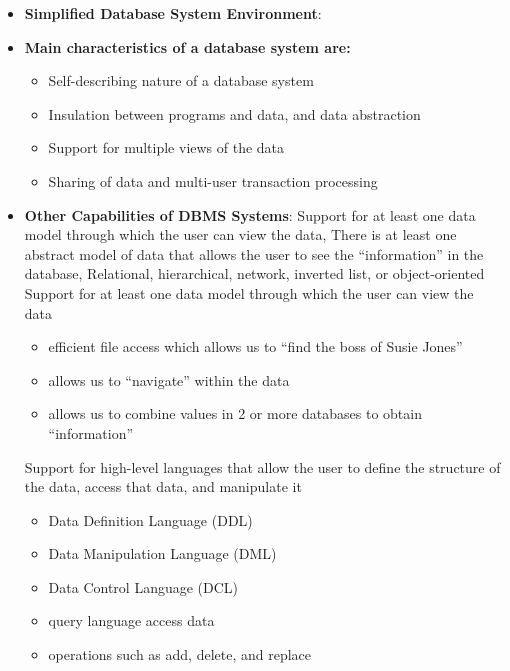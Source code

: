 \documentclass{report}
\begin{document}
\begin{itemize}
\begin{itemize}
            \end{itemize}
        \item \textbf{Simplified Database System Environment}:
            \bigbreak \noindent 
        \item \textbf{Main characteristics of a database system are:}
            \begin{itemize}
                \item Self-describing nature of a database system
                \item Insulation between programs and data, and data abstraction
                \item Support for multiple views of the data
                \item Sharing of data and multi-user transaction processing
            \end{itemize}
        \item \textbf{Other Capabilities of DBMS Systems}: Support for at least one data model through which the user can view the data, There is at least one abstract model of data that allows the user to see the “information” in the database, Relational, hierarchical, network, inverted list, or object-oriented
            \bigbreak \noindent 
            Support for at least one data model through which the user can view the data
            \begin{itemize}
                \item efficient file access which allows us to “find the boss of Susie Jones”
                \item allows us to “navigate” within the data
                \item allows us to combine values in 2 or more databases to obtain “information”
            \end{itemize}
            \bigbreak \noindent 
            Support for high-level languages that allow the user to define the structure of the data, access that data, and manipulate it
            \begin{itemize}
                \item Data Definition Language (DDL)
                \item Data Manipulation Language (DML)
                \item Data Control Language (DCL)
                \item query language access data
                \item operations such as add, delete, and replace

\end{itemize}
\end{itemize}
\end{document}
